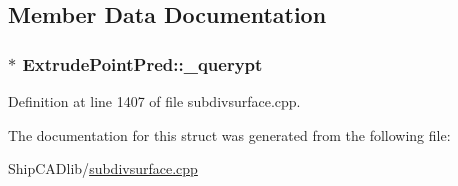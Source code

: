 \subsection{Member Data Documentation}
\hypertarget{structExtrudePointPred_af9fa40238ef74aca6b8f8d7e303aafb4}{
\subsubsection[{\-\_\-querypt}]{$\ast$ Extrude\-Point\-Pred\-::\-\_\-querypt}}\label{structExtrudePointPred_af9fa40238ef74aca6b8f8d7e303aafb4}


Definition at line 1407 of file subdivsurface.\-cpp.



The documentation for this struct was generated from the following file\-:\begin{DoxyCompactItemize}
\item 
Ship\-C\-A\-Dlib/\hyperlink{subdivsurface_8cpp}{subdivsurface.\-cpp}\end{DoxyCompactItemize}
